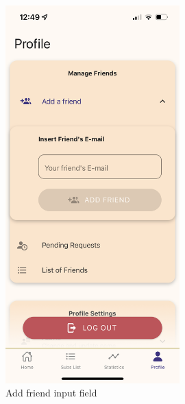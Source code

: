 \documentclass[11pt]{article}
\begin{document}
\begin{figure}[h!]
    \centering
    \begin{minipage}[c]{0.45\textwidth}
        \centering
        \includegraphics[width=0.6\textwidth, clip]{../../assets/smartphone/profileAdd.PNG}
        \caption{Add friend input field}
        \label{fig:profileAdd}
    \end{minipage}\hspace{1cm}%
    \begin{minipage}[c]{0.45\textwidth}
        \centering

\end{minipage}
\end{figure}
\end{document}
